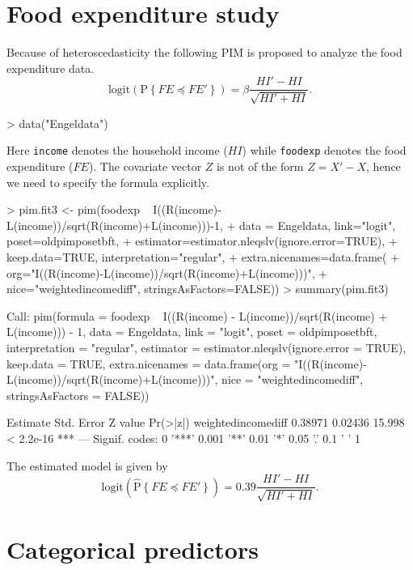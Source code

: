 \documentclass[12pt]{article}
\newcommand{\prob}[1]{\text{P}\left\{#1\right\}}
\newcommand{\hatprob}[1]{\hat{\text{P}}\left\{#1\right\}}
\newcommand{\leqs}{\preccurlyeq}
\begin{document}
\section{Food expenditure study}\label{S_fe}

Because of heteroscedasticity the following PIM is proposed to analyze the food expenditure data.
\[
\text{logit}\left( \prob{FE \leqs FE' } \right) = \beta \frac{HI' - HI}{\sqrt{HI' + HI}}.  
\]
\begin{Schunk}
\begin{Sinput}
> data("Engeldata")
\end{Sinput}
\end{Schunk}
Here \verb|income| denotes the household income ($HI$) while \verb|foodexp| denotes the food expenditure ($FE$). The covariate vector $Z$ is not of the form $Z = X' - X$, hence we need to specify the formula explicitly. 
\begin{Schunk}
\begin{Sinput}
> pim.fit3 <- pim(foodexp ~ I((R(income)-L(income))/sqrt(R(income)+L(income)))-1, 
+ 								data = Engeldata, link="logit", poset=oldpimposetbft, 
+ 								estimator=estimator.nleqslv(ignore.error=TRUE), 
+ 								keep.data=TRUE, interpretation="regular", 
+ 								extra.nicenames=data.frame(
+ 									org="I((R(income)-L(income))/sqrt(R(income)+L(income)))", 
+ 									nice="weightedincomediff", stringsAsFactors=FALSE))
> summary(pim.fit3)				
\end{Sinput}
\begin{Soutput}
Call:
pim(formula = foodexp ~ I((R(income) - L(income))/sqrt(R(income) + 
    L(income))) - 1, data = Engeldata, link = "logit", poset = oldpimposetbft, 
    interpretation = "regular", estimator = estimator.nleqslv(ignore.error = TRUE), 
    keep.data = TRUE, extra.nicenames = data.frame(org = "I((R(income)-L(income))/sqrt(R(income)+L(income)))", 
        nice = "weightedincomediff", stringsAsFactors = FALSE))

                   Estimate Std. Error Z value  Pr(>|z|)    
weightedincomediff  0.38971    0.02436  15.998 < 2.2e-16 ***
---
Signif. codes:  0 '***' 0.001 '**' 0.01 '*' 0.05 '.' 0.1 ' ' 1 
\end{Soutput}
\end{Schunk}
The estimated model is given by 
\[
\text{logit}\left( \hatprob{FE \leqs FE' } \right) =  0.39 \frac{HI' - HI}{\sqrt{HI' + HI}}.  
\]



\section{Categorical predictors}\label{S_categorical}
\end{document}
